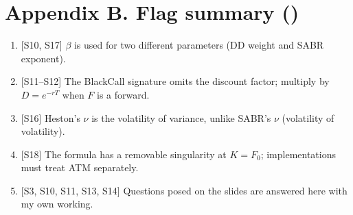 \documentclass[10pt]{article}
\begin{document}
\section*{Appendix B. Flag summary (\flag)}
\begin{enumerate}
\item {}[S10, S17] $\beta$ is used for two different parameters (DD weight and SABR exponent).
\item {}[S11--S12] The BlackCall signature omits the discount factor; multiply by $D=e^{-rT}$ when $F$ is a forward.
\item {}[S16] Heston's $\nu$ is the volatility of variance, unlike SABR's $\nu$ (volatility of volatility).
\item {}[S18] The formula has a removable singularity at $K=F_0$; implementations must treat ATM separately.
\item {}[S3, S10, S11, S13, S14] Questions posed on the slides are answered here with my own working.
\end{enumerate}
\end{document}
